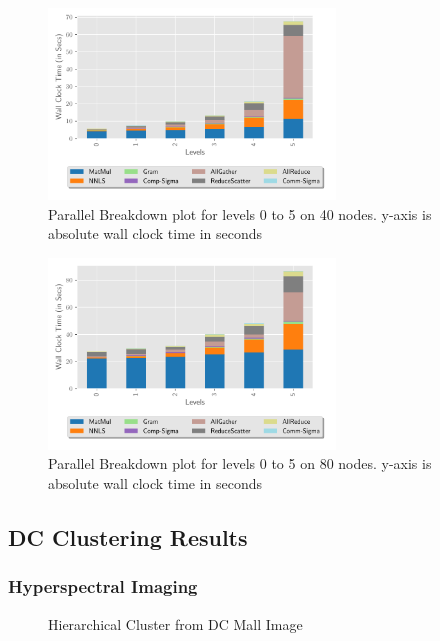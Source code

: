 \documentclass[conference,compsoc]{IEEEtran}
\begin{document}
\begin{figure}
\begin{center}
\includegraphics[height=2in, width=\columnwidth]{plots/synthetic_parallel_level_breakdown.pdf}
\caption{Parallel Breakdown plot for levels 0 to 5 on 40 nodes. y-axis is absolute wall clock time in seconds}
\label{fig:parallellevelbreakdown}
\end{center}
\end{figure}


\begin{figure}
\begin{center}
\includegraphics[height=2in, width=\columnwidth]{plots/realworld_parallel_level_breakdown.pdf}
\caption{Parallel Breakdown plot for levels 0 to 5 on 80 nodes. y-axis is absolute wall clock time in seconds}
\label{fig:rwparallellevelbreakdown}
\end{center}
\end{figure}


\subsection{DC Clustering Results}

\subsubsection{Hyperspectral Imaging}
\begin{figure}

\caption{Hierarchical Cluster from DC Mall Image}
\label{fig:dc}
\end{figure}
\end{document}
